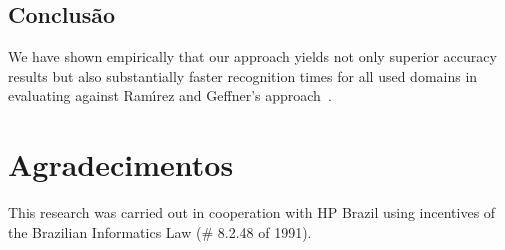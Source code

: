 \documentclass[a0,portrait]{a0poster}
\begin{document}
\begin{multicols}{2}
\vspace{-12mm}
\color{NavyBlue}
\section*{\huge Conclus\~ao}
\color{Black}

We have shown empirically that our approach yields not only superior accuracy results but also substantially faster recognition times for all used domains in evaluating against Ram{\'{\i}}rez and Geffner's approach~\cite{RamirezG_IJCAI2009}.


\vspace{-9mm}
\large
\color{NavyBlue}
\color{Black}
\raggedright



\end{multicols}
\vspace{-0.5cm}
\hrulefill
\normalsize
\vspace{-1cm}
\section*{Agradecimentos}
\vspace{-1cm}
This research was carried out in cooperation with HP Brazil using incentives of the Brazilian Informatics Law (\# 8.2.48 of 1991).

\end{document}
